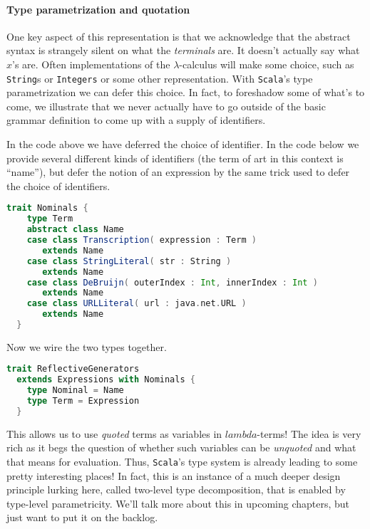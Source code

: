 \paragraph{Type parametrization and quotation}
One key aspect of this representation is that we acknowledge that the
abstract syntax is strangely silent on what the \emph{terminals}
are. It doesn't actually say what $x$'s are. Often implementations of
the $\lambda$-calculus will make some choice, such as
\lstinline[language=Scala]!String!s or
\lstinline[language=Scala]!Integers! or some other
representation. With \texttt{Scala}'s type parametrization we can
defer this choice. In fact, to foreshadow some of what's to come, we
illustrate that we never actually have to go outside of the basic
grammar definition to come up with a supply of identifiers.

In the code above we have deferred the choice of identifier. In the
code below we provide several different kinds of identifiers (the term
of art in this context is ``name''), but defer the notion of an
expression by the same trick used to defer the choice of identifiers.

\begin{lstlisting}[language=Scala]
  trait Nominals {
    type Term
    abstract class Name
    case class Transcription( expression : Term )
       extends Name
    case class StringLiteral( str : String )
       extends Name
    case class DeBruijn( outerIndex : Int, innerIndex : Int )
       extends Name
    case class URLLiteral( url : java.net.URL )
       extends Name
  }
\end{lstlisting}

Now we wire the two types together.

\begin{lstlisting}[language=Scala]
  trait ReflectiveGenerators
  extends Expressions with Nominals {
    type Nominal = Name
    type Term = Expression
  }
\end{lstlisting}

This allows us to use \emph{quoted} terms as variables in
$lambda$-terms! The idea is very rich as it begs the question of
whether such variables can be \emph{unquoted} and what that means for
evaluation. Thus, \texttt{Scala}'s type system is already leading
to some pretty interesting places! In fact, this is an instance of a
much deeper design principle lurking here, called two-level type
decomposition, that is enabled by type-level parametricity. We'll talk
more about this in upcoming chapters, but just want to put it on the
backlog.

